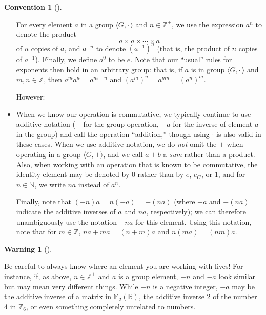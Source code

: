 \documentclass[10pt,]{book}
\theoremstyle{plain}
\theoremstyle{definition}
\theoremstyle{definition}
\newtheorem{convention}[theorem]{Convention}
\newtheorem{warning}[theorem]{Warning}
\theoremstyle{definition}
\theoremstyle{definition}
\numberwithin{equation}{section}
\def\Z{\mathbb{Z}}
\def\R{\mathbb{R}}
\def\N{\mathbb{N}}
\def\M{\mathbb{M}}
\def\Gdot{\langle G, \cdot\,\rangle}
\begin{document}
\begin{convention}[]
\begin{itemize}[label=\textbullet]
          For every element \(a\) in a group \(\Gdot\) and \(n\in \Z^+\), we use the expression \(a^n\) to denote  the product %
\begin{equation*}
a \times a \times \cdots \times a
\end{equation*}
 of \(n\) copies of \(a\), 
      and \(a^{-n}\) to denote \((a^{-1})^n\) (that is, the product of \(n\) copies of \(a^{-1}\)).
          Finally, we define \(a^0\) to be \(e\).  Note that our ``usual'' rules for exponents then hold in an arbitrary group: that is, if \(a\) is in group \(\langle G, \cdot\,\rangle\)
          and \(m,n\in \Z\), then \(a^m a^n = a^{m+n}\) and \((a^m)^n=a^{mn}=(a^n)^m\).
\par
However:%
\item{}When we know our operation is commutative, we typically
            continue to use additive notation (\(+\) for the group operation, \(-a\)
            for the inverse of element \(a\) in the group) and call the operation
            ``addition,'' though using \(\cdot\) is also valid in these cases. When
            we use additive notation, we do \emph{not} omit the \(+\) when
            operating in a group \(\langle G,+\rangle\), and we call \(a+b\) a \emph{sum} rather
            than a product. Also, when working with an operation that is known to be commutative, the identity element may be denoted by 0 rather than by \(e\), \(e_G\), or 1, and for \(n\in \N\), we write \(na\) instead of \(a^n\).%
\par
Finally, note that
            \((-n)a=n(-a)=-(na)\) (where \(-a\) and \(-(na)\) indicate the
            additive inverses of \(a\) and \(na\), respectively); we can therefore
            unambiguously use the notation \(-na\) for this element.
            Using this notation, note that for \(m\in \Z\), \(na+ma=(n+m)a\) and \(n(ma)=(nm)a\).%
\end{itemize}
\label{notation-38}
\end{convention}
\par

            \begin{warning}[]\label{warning-7}

                Be careful to always know where an element
                you are working with lives! For instance, if, as above, \(n\in
                \Z^+\) and \(a\) is a group element, \(-n\) and \(-a\) look similar but
                may mean very different things. While \(-n\) is a negative integer,
                \(-a\) may be the additive inverse of a matrix in \(\M_2(\R)\), the
                additive inverse 2 of the number 4 in \(\Z_6\), or even something
                completely unrelated to numbers.
\end{warning}
\end{document}
